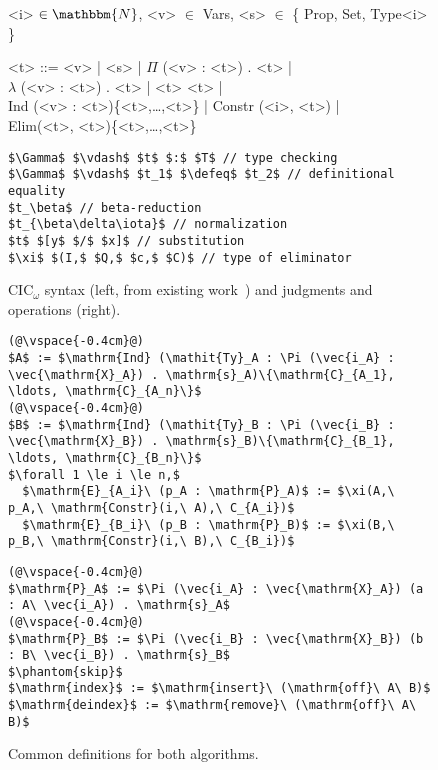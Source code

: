 \begin{figure}
\begin{minipage}{0.52\textwidth}
\small
\begin{grammar}
<i> $\in \mathbbm{N}$, <v> $\in$ Vars, <s> $\in$ \{ Prop, Set, Type<i> \}

<t> ::= <v> | <s> | $\Pi$ (<v> : <t>) . <t> | \\
$\lambda$ (<v> : <t>) . <t> | <t> <t> | \\
Ind (<v> : <t>)\{<t>,\ldots,<t>\} | Constr (<i>, <t>) | \\
Elim(<t>, <t>)\{<t>,\ldots,<t>\}
\end{grammar}
\end{minipage}
\hfill
\begin{minipage}{0.48\textwidth}
\footnotesize
\begin{lstlisting}
$\Gamma$ $\vdash$ $t$ $:$ $T$ // type checking
$\Gamma$ $\vdash$ $t_1$ $\defeq$ $t_2$ // definitional equality
$t_\beta$ // beta-reduction
$t_{\beta\delta\iota}$ // normalization
$t$ $[y$ $/$ $x]$ // substitution
$\xi$ $(I,$ $Q,$ $c,$ $C)$ // type of eliminator
\end{lstlisting}
\end{minipage}
\vspace{-0.3cm}
\caption{CIC$_\omega$ syntax (left, from existing work~\cite{Timany2015FirstST}) and judgments and operations (right).}
\label{fig:syntax}
\end{figure}


\begin{figure}
\begin{minipage}{0.60\textwidth}
\begin{lstlisting}
(@\vspace{-0.4cm}@)
$A$ := $\mathrm{Ind} (\mathit{Ty}_A : \Pi (\vec{i_A} : \vec{\mathrm{X}_A}) . \mathrm{s}_A)\{\mathrm{C}_{A_1}, \ldots, \mathrm{C}_{A_n}\}$
(@\vspace{-0.4cm}@)
$B$ := $\mathrm{Ind} (\mathit{Ty}_B : \Pi (\vec{i_B} : \vec{\mathrm{X}_B}) . \mathrm{s}_B)\{\mathrm{C}_{B_1}, \ldots, \mathrm{C}_{B_n}\}$
$\forall 1 \le i \le n,$
  $\mathrm{E}_{A_i}\ (p_A : \mathrm{P}_A)$ := $\xi(A,\ p_A,\ \mathrm{Constr}(i,\ A),\ C_{A_i})$
  $\mathrm{E}_{B_i}\ (p_B : \mathrm{P}_B)$ := $\xi(B,\ p_B,\ \mathrm{Constr}(i,\ B),\ C_{B_i})$
\end{lstlisting}
\end{minipage}
\hfill
\begin{minipage}{0.40\textwidth}
\begin{lstlisting}
(@\vspace{-0.4cm}@)
$\mathrm{P}_A$ := $\Pi (\vec{i_A} : \vec{\mathrm{X}_A}) (a : A\ \vec{i_A}) . \mathrm{s}_A$
(@\vspace{-0.4cm}@)
$\mathrm{P}_B$ := $\Pi (\vec{i_B} : \vec{\mathrm{X}_B}) (b : B\ \vec{i_B}) . \mathrm{s}_B$
$\phantom{skip}$
$\mathrm{index}$ := $\mathrm{insert}\ (\mathrm{off}\ A\ B)$
$\mathrm{deindex}$ := $\mathrm{remove}\ (\mathrm{off}\ A\ B)$
\end{lstlisting}
\end{minipage}
\vspace{-0.3cm}
\caption{Common definitions for both algorithms.}
\label{fig:common}
\end{figure}


